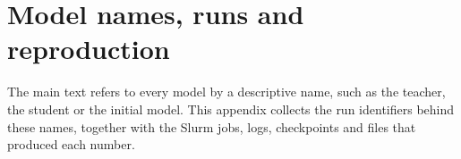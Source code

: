
\chapter{Model names, runs and reproduction}
\label{app:reproduction}
\begingroup %
\expandafter\def\expandafter\UrlBreaks\expandafter{\UrlBreaks\do\_\do\-}%

The main text refers to every model by a descriptive name, such as the teacher, the student or the initial model.
This appendix collects the run identifiers behind these names, together with the Slurm jobs, logs, checkpoints and
files that produced each number.

